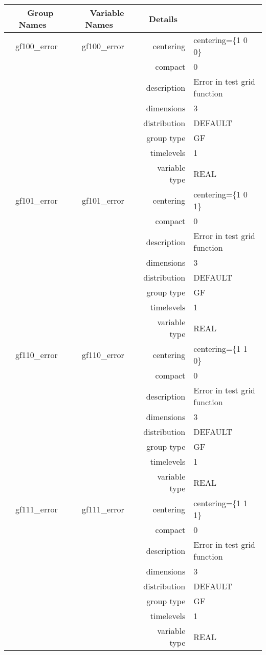 \begin{tabular*}{150mm}{|c|c@{\extracolsep{\fill}}|rl|} \hline 
~ {\bf Group Names} ~ & ~ {\bf Variable Names} ~  &{\bf Details} ~ & ~ \\ 
\hline 
gf100\_error & gf100\_error & centering & centering=\{1 0 0\} \\ 
 &  & compact & 0 \\ 
 &  & description & Error in test grid function \\ 
 &  & dimensions & 3 \\ 
 &  & distribution & DEFAULT \\ 
 &  & group type & GF \\ 
 &  & timelevels & 1 \\ 
 &  & variable type & REAL \\ 
\hline 
gf101\_error & gf101\_error & centering & centering=\{1 0 1\} \\ 
 &  & compact & 0 \\ 
 &  & description & Error in test grid function \\ 
 &  & dimensions & 3 \\ 
 &  & distribution & DEFAULT \\ 
 &  & group type & GF \\ 
 &  & timelevels & 1 \\ 
 &  & variable type & REAL \\ 
\hline 
gf110\_error & gf110\_error & centering & centering=\{1 1 0\} \\ 
 &  & compact & 0 \\ 
 &  & description & Error in test grid function \\ 
 &  & dimensions & 3 \\ 
 &  & distribution & DEFAULT \\ 
 &  & group type & GF \\ 
 &  & timelevels & 1 \\ 
 &  & variable type & REAL \\ 
\hline 
gf111\_error & gf111\_error & centering & centering=\{1 1 1\} \\ 
 &  & compact & 0 \\ 
 &  & description & Error in test grid function \\ 
 &  & dimensions & 3 \\ 
 &  & distribution & DEFAULT \\ 
 &  & group type & GF \\ 
 &  & timelevels & 1 \\ 
 &  & variable type & REAL \\ 

\end{tabular*}
